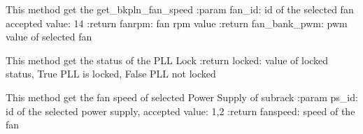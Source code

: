 \documentclass[letterpaper,10pt,english]{sphinxmanual}
\begin{document}
\begin{fulllineitems}
\begin{fulllineitems}
\begin{quote}
\begin{description}
\end{description}\end{quote}

\end{fulllineitems}


\begin{fulllineitems}
\label{\detokenize{apidocs:subrack_management_board.SubrackMngBoard.GetFanSpeed}}
\pysigstartsignatures
{}
\pysigstopsignatures
\sphinxAtStartPar
This method get the get\_bkpln\_fan\_speed
:param fan\_id: id of the selected fan accepted value: 1\sphinxhyphen{}4
:return fanrpm: fan rpm value
:return fan\_bank\_pwm: pwm value of selected fan

\end{fulllineitems}


\begin{fulllineitems}
\label{\detokenize{apidocs:subrack_management_board.SubrackMngBoard.GetLockedPLL}}
\pysigstartsignatures
{}
\pysigstopsignatures
\sphinxAtStartPar
This method get the status of the PLL Lock
:return locked: value of locked status, True PLL is locked, False PLL not locked

\end{fulllineitems}


\begin{fulllineitems}
\label{\detokenize{apidocs:subrack_management_board.SubrackMngBoard.GetPSFanSpeed}}
\pysigstartsignatures
{}
\pysigstopsignatures
\sphinxAtStartPar
This method get the fan speed of selected Power Supply of subrack
:param ps\_id: id of the selected power supply, accepted value: 1,2
:return fanspeed: speed of the fan


\end{fulllineitems}
\end{fulllineitems}
\end{document}
